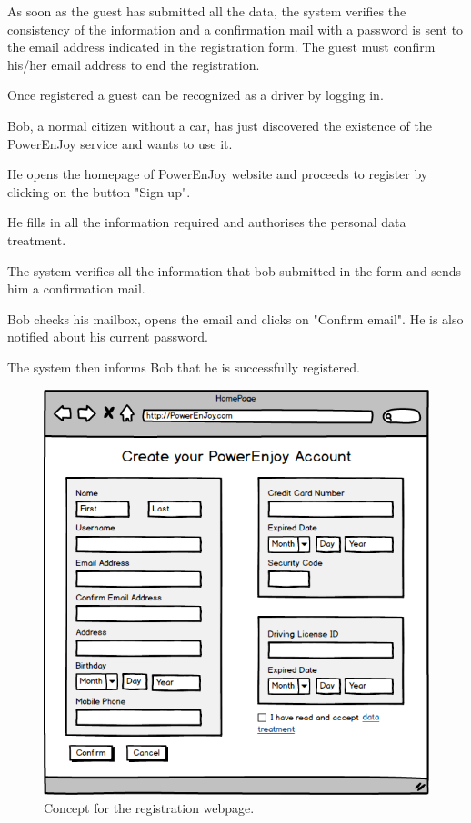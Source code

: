 As soon as the guest has submitted all the data, the system verifies the consistency of the information and a confirmation mail with a password is sent to the email address indicated in the registration form. The guest must confirm his/her email address to end the registration.

Once registered a guest can be recognized as a driver by logging in.

Bob, a normal citizen without a car, has just discovered the existence of the PowerEnJoy service and wants to use it.

He opens the homepage of PowerEnJoy website and proceeds to register by clicking on the button "Sign up".

He fills in all the information required and authorises the personal data treatment. 

The system verifies all the information that bob submitted in the form and sends him a confirmation mail.

Bob checks his mailbox, opens the email and clicks on "Confirm email". He is also notified about his current password.

The system then informs Bob that he is successfully registered.

\begin{figure}[H]
	\centering
	\includegraphics[width=\textwidth]{mockup/WebRegistration.png}
	\caption{Concept for the registration webpage.}
\end{figure}


